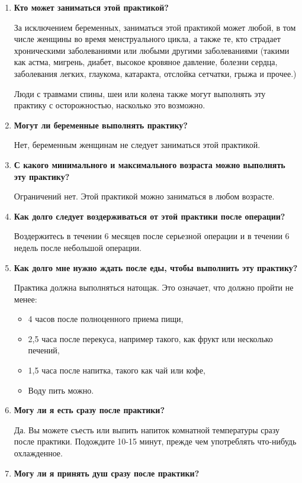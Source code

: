 \documentclass[
a4paper, %
12pt, %
article,
onecolumn, %
openany, %
]{memoir}
\begin{document}
\begin{enumerate}
    
    \item \textbf{Кто может заниматься этой практикой?}

За исключением беременных, заниматься этой практикой может любой, в том
числе женщины во время менструального цикла, а также те, кто страдает
хроническими заболеваниями или любыми другими заболеваниями (такими как астма,
мигрень, диабет, высокое кровяное давление, болезни сердца, заболевания легких,
глаукома, катаракта, отслойка сетчатки, грыжа и прочее.)

Люди с травмами спины, шеи или колена также могут выполнять эту практику с
осторожностью, насколько это возможно.
\item \textbf{Могут ли беременные выполнять практику?}

Нет, беременным женщинам не следует заниматься этой практикой.
\item \textbf{С какого минимального и максимального возраста можно выполнять эту практику?}

Ограничений нет. Этой практикой можно заниматься в любом возрасте.
\item \textbf{Как долго следует воздерживаться от этой практики после операции?}

Воздержитесь в течении 6 месяцев после серьезной операции и в течении 6 недель
после небольшой операции.


\item \textbf{Как долго мне нужно ждать после еды, чтобы выполнить эту практику?}

Практика должна выполняться натощак.
Это означает, что должно пройти не менее:
\begin{itemize}
\item 4 часов после полноценного приема пищи,
\item 2,5 часа после перекуса, например такого, как фрукт или несколько печений,
\item 1,5 часа после напитка, такого как чай или кофе,
\item Воду пить можно.
\end{itemize}

\item \textbf{Могу ли я есть сразу после практики?}

Да. Вы можете съесть или выпить напиток комнатной температуры сразу после
практики. Подождите 10-15 минут, прежде чем употреблять что-нибудь охлажденное.
\item \textbf{Могу ли я принять душ сразу после практики?}


\end{enumerate}
\end{document}
